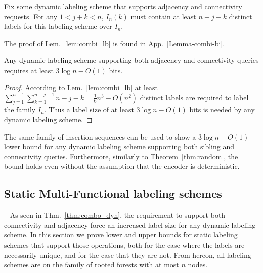 \documentclass{llncs}
\begin{document}
\begin{lemma}\label{lem:combi_lb}
   Fix some dynamic labeling scheme that supports adjacency and connectivity requests.
    For any $1 < j+k < n$, $I_n(k)$ must contain at least $n-j-k$ distinct labels for this labeling scheme over $I_n$.
\end{lemma}
The  proof of  Lem.~\ref{lem:combi_lb} is found in  App.~\ref{Lemma-combi-bi}.

\begin{theorem}\label{thm:combo_dyn}
    Any dynamic labeling scheme supporting both adjacency and connectivity
    queries requires at least $3\log n - O(1)$ bits.
\end{theorem}
\begin{proof}
	According to Lem.~\ref{lem:combi_lb} at least
	$\sum_{j=1}^{n-1}\sum_{k=1}^{n-j-1} n-j-k = \frac{1}{6}n^3 - O(n^2)$ distinct labels
	are required to label the family $I_n$. Thus a label size of at least $3\log n
	- O(1)$ bits is needed by any dynamic labeling scheme.
\end{proof}

The same family of insertion sequences can be used to show a $3\log n - O(1)$
lower bound for any dynamic labeling scheme supporting both sibling and
connectivity queries. Furthermore, similarly to Theorem~\ref{thm:random}, the
bound holds even without the assumption that the encoder is deterministic.


\subsection{Static Multi-Functional   labeling schemes}~\label{sec:static-multi}
As seen in Thm.~\ref{thm:combo_dyn}, the requirement to support both connectivity and adjacency force an increased label size for any dynamic labeling scheme.
In this section we prove  lower and upper bounds for static labeling schemes that support those operations, both for the case where the labels are necessarily unique, and for the case that they are not. From hereon, all labeling schemes are on the family of rooted forests with at most $n$ nodes.
\end{document}
